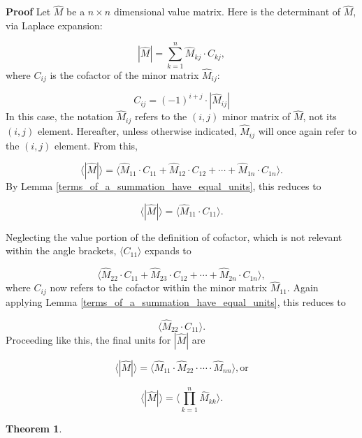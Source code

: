 \documentclass[10pt,letterpaper]{article}
\newtheorem{thm}{Theorem}[section]
\newenvironment{proof}{\noindent\textbf{Proof} }{\qed \newline}
\newcommand{\qed}{\nobreak \ifvmode \relax \else
      \ifdim\lastskip<1.5em \hskip-\lastskip
      \hskip1.5em plus0em minus0.5em \fi \nobreak
      \vrule height0.75em width0.5em depth0.25em\fi}
\numberwithin{equation}{section}
\begin{document}
\begin{proof}Let $\hat M$ be a $n \times n$ dimensional value matrix.
  Here is the determinant of $\hat M$, via Laplace expansion:

\[ | \hat M | = \sum_{k=1}^n \hat M_{kj} \cdot C_{kj} , \] where $C_{ij}$ is the
cofactor of the minor matrix $\hat M_{ij}$:

\[ C_{ij} = (-1)^{i + j} \cdot | \hat M_{ij} | \] In this case, the
notation $\hat M_{ij}$ refers to the $(i, j)$ minor matrix of $\hat
M$, not its $(i, j)$ element. Hereafter, unless otherwise indicated,
$\hat M_{ij}$ will once again refer to the $(i, j)$ element.  From
this,

\[ \langle | \hat M | \rangle = \langle \hat M_{11} \cdot C_{11} +
\hat M_{12} \cdot C_{12} + \cdots + \hat M_{1n} \cdot C_{1n}\rangle
. \] By Lemma \ref{terms_of_a_summation_have_equal_units}, this
reduces to

\[ \langle | \hat M | \rangle = \langle \hat M_{11} \cdot C_{11}
\rangle . \]

Neglecting the value portion of the definition of cofactor, which is
not relevant within the angle brackets, $\langle C_{11} \rangle$
expands to

\[ \langle \hat M_{22} \cdot C_{11} + \hat M_{23} \cdot C_{12} +
\cdots + \hat M_{2n} \cdot C_{1n} \rangle , \] where $C_{ij}$ now
refers to the cofactor within the minor matrix $\hat M_{11}$.  Again
applying Lemma \ref{terms_of_a_summation_have_equal_units}, this
reduces to

\[ \langle \hat M_{22} \cdot C_{11} \rangle . \]  Proceeding like
this, the final units for $| \hat M |$ are

\[ \langle | \hat M | \rangle = \langle \hat M_{11} \cdot \hat M_{22}
\cdot \cdots \cdot \hat M_{nn} \rangle , \mbox{or} \]

\[ \langle | \hat M | \rangle = \langle \prod_{k=1}^n \hat M_{kk}
\rangle . \] \end{proof}

\begin{thm} \end{thm}
\end{document}
